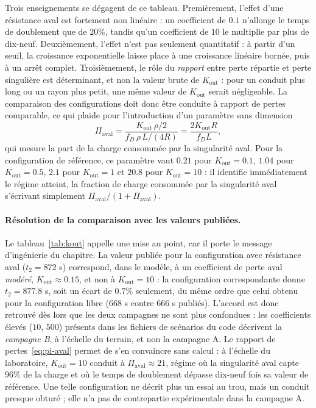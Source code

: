 \documentclass[11pt,a4paper]{report}
\newcommand{\kout}{K_{\mathrm{out}}}
\begin{document}
Trois enseignements se dégagent de ce tableau. Premièrement, l'effet d'une résistance aval est fortement
non linéaire : un coefficient de \(0.1\) n'allonge le temps de doublement que de \(20\%\), tandis qu'un
coefficient de \(10\) le multiplie par plus de dix-neuf. Deuxièmement, l'effet n'est pas seulement
quantitatif : à partir d'un seuil, la croissance exponentielle laisse place à une croissance linéaire
bornée, puis à un arrêt complet. Troisièmement, le rôle du \emph{rapport} entre perte répartie et perte
singulière est déterminant, et non la valeur brute de \(\kout\) : pour un conduit plus long ou un rayon
plus petit, une même valeur de \(\kout\) serait négligeable. La comparaison des configurations doit donc
être conduite à rapport de pertes comparable, ce qui plaide pour l'introduction d'un paramètre sans
dimension
\begin{equation}
\Pi_{\mathrm{aval}} = \frac{\kout\,\rho/2}{f_D\,\rho\,L/(4R)}
= \frac{2\kout R}{f_D L},
\label{eq:pi-aval}
\end{equation}
qui mesure la part de la charge consommée par la singularité aval. Pour la configuration de référence, ce paramètre vaut \(0.21\) pour
\(\kout = 0.1\), \(1.04\) pour \(\kout = 0.5\), \(2.1\) pour \(\kout = 1\) et \(20.8\) pour
\(\kout = 10\) : il identifie immédiatement le régime atteint, la fraction de charge consommée par la
singularité aval s'écrivant simplement \(\Pi_{\mathrm{aval}}/(1+\Pi_{\mathrm{aval}})\).

\paragraph{Résolution de la comparaison avec les valeurs publiées.}
Le tableau~\ref{tab:kout} appelle une mise au point, car il porte le message d'ingénierie du chapitre. La
valeur publiée pour la configuration avec résistance aval (\(t_2 = 872\) s) correspond, dans le modèle, à
un coefficient de perte aval \emph{modéré}, \(\kout \approx 0.15\), et non à \(\kout = 10\) : la
configuration correspondante donne \(t_2 = 877.8\) s, soit un écart de \(0.7\%\) seulement, du même ordre
que celui obtenu pour la configuration libre (\(668\) s contre \(666\) s publiés). L'accord est donc
retrouvé dès lors que les deux campagnes ne sont plus confondues : les coefficients élevés
(\(10\), \(500\)) présents dans les fichiers de scénarios du code décrivent la \emph{campagne B}, à
l'échelle du terrain, et non la campagne A. Le rapport de pertes~\eqref{eq:pi-aval} permet de s'en
convaincre sans calcul : à l'échelle du laboratoire, \(\kout = 10\) conduit à
\(\Pi_{\mathrm{aval}} \approx 21\), régime où la singularité aval capte \(96\%\) de la charge et où le temps
de doublement dépasse dix-neuf fois sa valeur de référence. Une telle configuration ne décrit plus un essai
au trou, mais un conduit presque obturé ; elle n'a pas de contrepartie expérimentale dans la campagne A.
\end{document}
